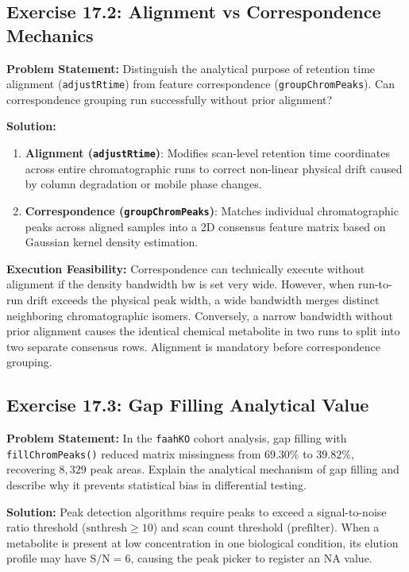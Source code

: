 \documentclass[11pt,twoside,openright]{book}
\begin{document}
\subsection*{Exercise 17.2: Alignment vs Correspondence Mechanics}
\noindent\textbf{Problem Statement:}\enspace
Distinguish the analytical purpose of retention time alignment (\texttt{adjustRtime}) from feature correspondence (\texttt{groupChromPeaks}). Can correspondence grouping run successfully without prior alignment?

\noindent\textbf{Solution:}\enspace
\begin{enumerate}
\item \textbf{Alignment (\texttt{adjustRtime})}: Modifies scan-level retention time coordinates across entire chromatographic runs to correct non-linear physical drift caused by column degradation or mobile phase changes.
\item \textbf{Correspondence (\texttt{groupChromPeaks})}: Matches individual chromatographic peaks across aligned samples into a 2D consensus feature matrix based on Gaussian kernel density estimation.
\end{enumerate}

\noindent\textbf{Execution Feasibility:}\enspace
Correspondence can technically execute without alignment if the density bandwidth $\text{bw}$ is set very wide. However, when run-to-run drift exceeds the physical peak width, a wide bandwidth merges distinct neighboring chromatographic isomers. Conversely, a narrow bandwidth without prior alignment causes the identical chemical metabolite in two runs to split into two separate consensus rows. Alignment is mandatory before correspondence grouping.

\subsection*{Exercise 17.3: Gap Filling Analytical Value}
\noindent\textbf{Problem Statement:}\enspace
In the \texttt{faahKO} cohort analysis, gap filling with \texttt{fillChromPeaks()} reduced matrix missingness from $69.30\%$ to $39.82\%$, recovering $8{,}329$ peak areas. Explain the analytical mechanism of gap filling and describe why it prevents statistical bias in differential testing.

\noindent\textbf{Solution:}\enspace
Peak detection algorithms require peaks to exceed a signal-to-noise ratio threshold ($\text{snthresh} \ge 10$) and scan count threshold ($\text{prefilter}$). When a metabolite is present at low concentration in one biological condition, its elution profile may have $\text{S/N} = 6$, causing the peak picker to register an NA value.
\end{document}

